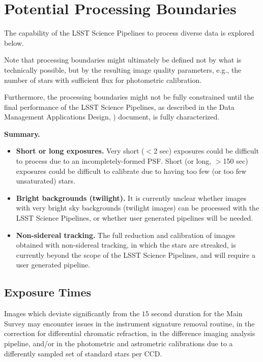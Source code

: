 \section{Potential Processing Boundaries}\label{sec:procbounds}

The capability of the LSST Science Pipelines to process diverse data is explored below.

Note that processing boundaries might ultimately be defined not by what is technically 
possible, but by the resulting image quality parameters, e.g., the number of stars with 
sufficient flux for photometric calibration.

Furthermore, the processing boundaries might not be fully constrained until the final 
performance of the LSST Science Pipelines, as described in the Data Management 
Applications Design, ) document, is fully characterized.

{\bf Summary.}\\

\begin{itemize}
\item \textbf{Short or long exposures.} Very short ($<$2 sec) exposures could be difficult to 
process due to an incompletely-formed PSF. Short (or long, $>$150 sec) exposures 
could be difficult to calibrate due to having too few (or too few unsaturated) stars.
\item \textbf{Bright backgrounds (twilight).} It is currently unclear whether images with very 
bright sky backgrounds (twilight images) can be processed with the LSST Science Pipelines, 
or whether user generated pipelines will be needed.
\item \textbf{Non-sidereal tracking.} The full reduction and calibration of images obtained 
with non-sidereal tracking, in which the stars are streaked, is currently beyond the scope 
of the LSST Science Pipelines, and will require a user generated pipeline.
\end{itemize}


\subsection{Exposure Times}\label{ssec:procbounds_expt}

Images which deviate significantly from the $15$ second duration for the Main Survey 
may encounter issues in the instrument signature removal routine, in the correction for 
differential chromatic refraction, in the difference imaging analysis pipeline, and/or in 
the photometric and astrometric calibrations due to a differently sampled set of standard 
stars per CCD.


